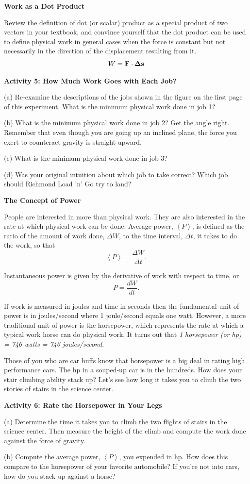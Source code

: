 \textbf{Work as a Dot Product }

Review the definition of dot (or scalar) product as a special product of two
vectors in your textbook, and convince yourself that the dot product can be
used to define physical work in general cases when the force is constant but
not necessarily in the direction of the displacement resulting from it. 
\[W={\bf F}\cdot {\bf \Delta s}\]


\textbf{Activity 5: How Much Work Goes with Each Job? }

(a) Re-examine the descriptions of the jobs shown in the figure on the first
page of this experiment. What is the minimum physical work done in job 1?
\vspace{20mm}

(b) What is the minimum physical work done in job 2? Get the angle right. 
Remember that even though you are going up an inclined plane, the force you 
exert to counteract gravity is straight upward.
\answerspace{25mm}


\pagebreak[2]
(c) What is the minimum physical work done in job 3?
\answerspace{25mm}

(d) Was your original intuition about which job to take correct? Which job 
should Richmond Load 'n' Go try to land?
\vspace{20mm}

\textbf{The Concept of Power} 

People are interested in more than physical work. They are also interested in
the rate at which physical work can be done. Average power, \( \left\langle P\right\rangle  \),
is defined as the ratio of the amount of work done, \( \Delta  W\), to the
time interval, \( \Delta  t\), it takes to do the work, so that
\[
\left\langle P\right\rangle =\frac{\Delta W}{\Delta t}.\]


Instantaneous power is given by the derivative of work with respect to time,
or
\[
P=\frac{dW}{dt}.\]


If work is measured in joules and time in seconds then the fundamental unit
of power is in joules/second where 1 joule/second equals one watt. However,
a more traditional unit of power is the horsepower, which represents the rate
at which a typical work horse can do physical work. It turns out that \textit{1
horsepower (or hp) = 746 watts = 746 joules/second}.

Those of you who are car buffs know that horsepower is a big deal in rating
high performance cars. The hp in a souped-up car is in the hundreds. How does
your stair climbing ability stack up? Let's see how long it takes you to climb
the two stories of stairs in the science center.

\textbf{Activity 6: Rate the Horsepower in Your Legs} 

(a) Determine the time it takes you to climb the two flights of stairs in
the science center. Then measure the height of the climb and compute the work
done against the force of gravity.
\vspace{25mm}

(b) Compute the average power, \( \left\langle P\right\rangle  \), you expended
in hp. How does this compare to the horsepower of your favorite automobile?
If you're not into cars, how do you stack up against a horse?


